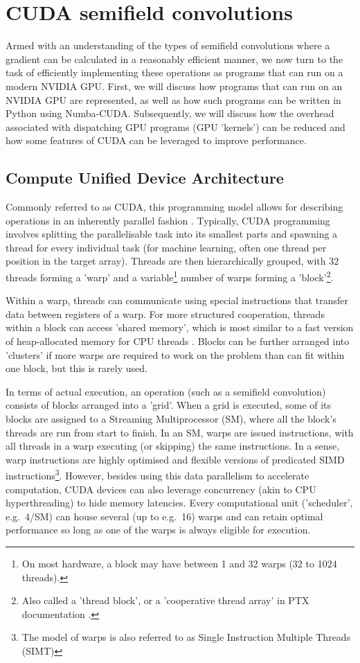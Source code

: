 \documentclass[a4paper, 12pt, openright]{report}
\begin{document}
\chapter{CUDA semifield convolutions}
Armed with an understanding of the types of semifield convolutions where a gradient can be calculated in a reasonably efficient manner, we now turn to the task of efficiently implementing these operations as programs that can run on a modern NVIDIA GPU. First, we will discuss how programs that can run on an NVIDIA GPU are represented, as well as how such programs can be written in Python using Numba-CUDA. Subsequently, we will discuss how the overhead associated with dispatching GPU programs (GPU 'kernels') can be reduced and how some features of CUDA can be leveraged to improve performance.

\section{Compute Unified Device Architecture}
Commonly referred to as CUDA, this programming model allows for describing operations in an inherently parallel fashion \cite{cuda}. Typically, CUDA programming involves splitting the parallelisable task into its smallest parts and spawning a thread for every individual task (for machine learning, often one thread per position in the target array). Threads are then hierarchically grouped, with 32 threads forming a 'warp' and a variable\footnote{On most hardware, a block may have between 1 and 32 warps \cite{blackwell_tuning} (32 to 1024 threads).} number of warps forming a 'block'\footnote{Also called a 'thread block', or a 'cooperative thread array' in PTX documentation \cite{ptx}.}.

Within a warp, threads can communicate using special instructions that transfer data between registers of a warp. For more structured cooperation, threads within a block can access 'shared memory', which is most similar to a fast version of heap-allocated memory for CPU threads \cite{cuda}. Blocks can be further arranged into 'clusters' if more warps are required to work on the problem than can fit within one block, but this is rarely used.

In terms of actual execution, an operation (such as a semifield convolution) consists of blocks arranged into a 'grid'. When a grid is executed, some of its blocks are assigned to a Streaming Multiprocessor (SM), where all the block's threads are run from start to finish. In an SM, warps are issued instructions, with all threads in a warp executing (or skipping) the same instructions. In a sense, warp instructions are highly optimised and flexible versions of predicated SIMD instructions\footnote{The model of warps is also referred to as Single Instruction Multiple Threads (SIMT)}. However, besides using this data parallelism to accelerate computation, CUDA devices can also leverage concurrency (akin to CPU hyperthreading) to hide memory latencies. Every computational unit ('scheduler', e.g.\ 4/SM) can house several (up to e.g.\ 16) warps and can retain optimal performance so long as one of the warps is always eligible for execution. 
\end{document}
